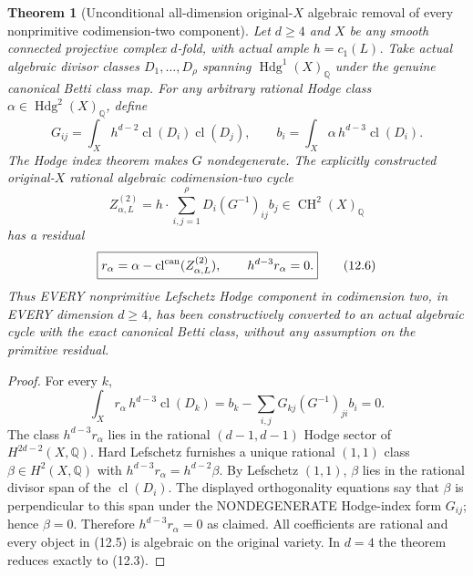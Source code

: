 \documentclass[11pt]{article}
\newcommand{\Q}{\mathbb Q}
\newcommand{\CH}{\operatorname{CH}}
\newcommand{\cl}{\operatorname{cl}}
\newtheorem{theorem}{Theorem}[section]
\begin{document}
\begin{theorem}[Unconditional all-dimension original-\(X\) algebraic removal of every nonprimitive codimension-two component]
Let \(d\ge4\) and \(X\) be \emph{any} smooth connected
projective complex \(d\)-fold, with actual ample \(h=c_1(L)\).
Take actual algebraic divisor classes
\(D_1,\ldots,D_\rho\) spanning
\(\operatorname{Hdg}^{1}(X)_\Q\)
under the genuine canonical Betti class map.
For any arbitrary rational Hodge class
\(\alpha\in\operatorname{Hdg}^{2}(X)_\Q\), define
\[
 G_{ij}=\int_X h^{d-2}\cl(D_i)\cl(D_j),
 \qquad b_i=\int_X\alpha\,h^{d-3}\cl(D_i).
                                                               \tag{12.4}
\]
The Hodge index theorem makes \(G\) nondegenerate.
The \emph{explicitly constructed original-\(X\)}
rational algebraic codimension-two cycle
\[
 \boxed{
 Z_{\alpha,L}^{(2)}
   =h\cdot\sum_{i,j=1}^{\rho}
       D_i(G^{-1})_{ij}b_j\in\CH^2(X)_\Q
 }                                                     \tag{12.5}
\]
has a residual
\[
 \boxed{
 r_\alpha=\alpha-\cl^{\rm can}(Z_{\alpha,L}^{(2)}),
 \qquad h^{d-3}r_\alpha=0.
 }                                                     \tag{12.6}
\]
Thus EVERY \emph{nonprimitive Lefschetz Hodge component}
in codimension two, in EVERY dimension \(d\ge4\),
has been constructively converted to an actual algebraic
cycle with the exact canonical Betti class,
without any assumption on the primitive residual.
\end{theorem}
\begin{proof}
For every \(k\),
\[
 \int_Xr_\alpha\,h^{d-3}\cl(D_k)
    =b_k-\sum_{i,j}G_{kj}(G^{-1})_{ji}b_i=0.
\]
The class \(h^{d-3}r_\alpha\) lies in the
rational \((d-1,d-1)\) Hodge sector
of \(H^{2d-2}(X,\Q)\).
Hard Lefschetz furnishes a unique rational
\((1,1)\) class \(\beta\in H^2(X,\Q)\) with
\(h^{d-3}r_\alpha=h^{d-2}\beta\).
By Lefschetz \((1,1)\), \(\beta\) lies in
the rational divisor span of the \(\cl(D_i)\).
The displayed orthogonality equations say
that \(\beta\) is perpendicular to this span
under the NONDEGENERATE Hodge-index form
\(G_{ij}\); hence \(\beta=0\).
Therefore \(h^{d-3}r_\alpha=0\) as claimed.
All coefficients are rational and every
object in (12.5) is algebraic on the
original variety. In \(d=4\) the theorem
reduces exactly to (12.3).
\end{proof}
\end{document}
